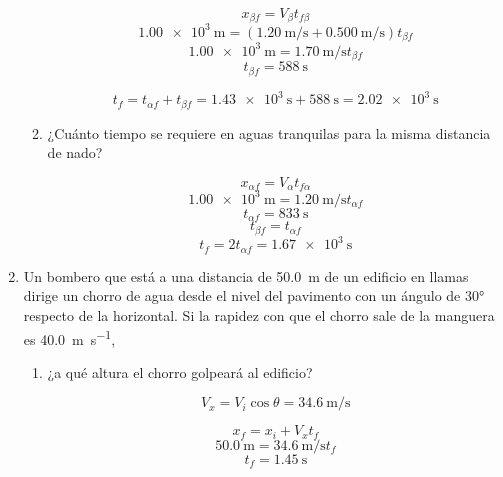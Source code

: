 \documentclass[../practica.root.tex]{subfiles}
\begin{document}
\begin{enumerate}
\begin{enumerate}
\begin{multicols}{2}
			            \[x_{\beta f}=V_{\beta}t_{f\beta}\]
			            \[\SI{1,00e3}{\meter}=\left(\SI{1,20}{\meter\per\second}+\SI{0,500}{\meter\per\second}\right)t_{\beta f}\]
			            \[\SI{1,00e3}{\meter}=\SI{1,70}{\meter\per\second}t_{\beta f}\]
			            \[t_{\beta f}=\SI{588}{\second}\]
		            \end{multicols}

		            \[t_f=t_{\alpha f}+t_{\beta f}=\SI{1,43e3}{\second}+\SI{588}{\second}=\boxed{\SI{2,02e3}{\second}}\]

		      \item ¿Cuánto tiempo se requiere en aguas tranquilas para la misma distancia de nado?

		            \[x_{\alpha f}=V_{\alpha}t_{f\alpha}\]
		            \[\SI{1,00e3}{\meter}=\SI{1,20}{\meter\per\second}t_{\alpha f}\]
		            \[t_{\alpha f}=\SI{833}{\second}\]
		            \[t_{\beta f}=t_{\alpha f}\]
		            \[t_f=2t_{\alpha f}=\boxed{\SI{1,67e3}{\second}}\]
	      \end{enumerate}

	\item Un bombero que está a una distancia de \SI{50,0}{\meter} de un edificio en llamas dirige un chorro de agua desde el nivel del pavimento con un ángulo de \ang{30} respecto de la horizontal. Si la rapidez con que el chorro sale de la manguera es \SI{40,0}{\meter\per\second},

	      \begin{center}
	      \end{center}

	      \begin{enumerate}
		      \item ¿a qué altura el chorro golpeará al edificio?

		            \[V_x=V_i\cos{\theta}=\SI{34,6}{\meter\per\second}\]

		            \[x_f=x_i+V_xt_f\]
		            \[\SI{50,0}{\meter}=\SI{34,6}{\meter\per\second}t_f\]
		            \[t_f=\SI{1,45}{\second}\]


\end{enumerate}
\end{enumerate}
\end{document}
